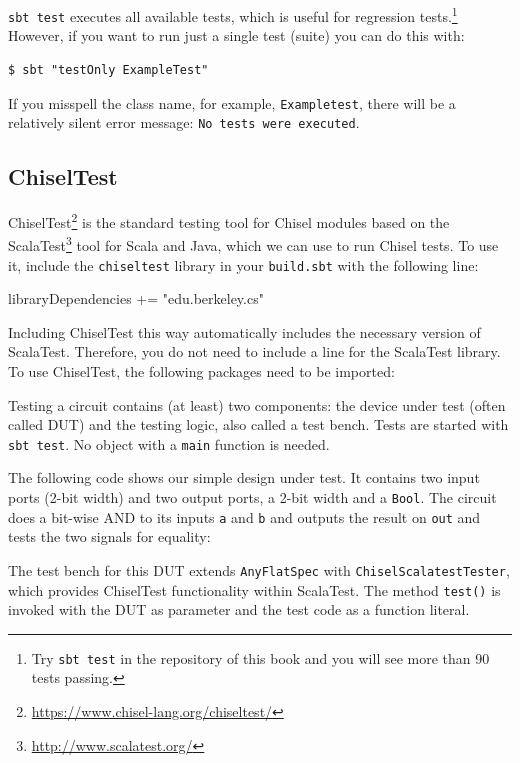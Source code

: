 \documentclass[%
    10pt,
    headinclude, footexclude,
    openright, %
    notitlepage,
    cleardoubleempty,
    headsepline,
    pointlessnumbers,
    bibtotoc, idxtotoc,
    ]{scrbook}
\newcommand{\code}[1]{{\small{\texttt{#1}}}}
\newcommand{\codefoot}[1]{{\footnotesize{\texttt{#1}}}}
\newcommand{\myref}[2]{\href{#1}{#2}}
\renewcommand{\myref}[2]{{#2}{\footnote{\url{#1}}}}
\begin{document}
\code{sbt test} executes all available tests, which is useful for regression
tests.\footnote{Try \codefoot{sbt test} in the repository of this book and you
will see more than 90 tests passing.}
However, if you want to run just a single test (suite) you can do this with:

\begin{verbatim}
$ sbt "testOnly ExampleTest"
\end{verbatim}

\noindent If you misspell the class name, for example, \code{Exampletest},
there will be a relatively silent error message: \code{No tests were executed}.

\subsection{ChiselTest}


\myref{https://www.chisel-lang.org/chiseltest/}{ChiselTest} is the standard testing tool
for Chisel modules based on the \myref{http://www.scalatest.org/}{ScalaTest} tool for Scala
and Java, which we can use to run Chisel tests.
To use it, include the \code{chiseltest} library in your \code{build.sbt} with the following line:

\begin{chisel}
libraryDependencies += "edu.berkeley.cs" %
\end{chisel}

\noindent Including ChiselTest this way automatically includes the necessary version of ScalaTest.
Therefore, you do not need to include a line for the ScalaTest library.
To use ChiselTest, the following packages need to be imported:


\noindent Testing a circuit contains (at least) two components: the device under test (often
called DUT) and the testing logic, also called a test bench. Tests are started with \code{sbt test}.
No object with a \code{main} function is needed.

The following code shows our simple design under test. It contains two input
ports (2-bit width) and two output ports, a 2-bit width and a \code{Bool}. The circuit does a bit-wise AND
to its inputs \code{a} and \code{b} and outputs the result on \code{out} and tests the two signals for
equality:


The test bench for this DUT extends \code{AnyFlatSpec} with \code{ChiselScalatestTester},
which provides ChiselTest functionality within ScalaTest.
The method \code{test()} is invoked with the DUT as parameter and the test code as a function literal.
\end{document}
